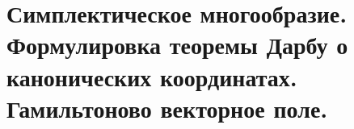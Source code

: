 \section{Симплектическое многообразие. Формулировка теоремы Дарбу о канонических координатах. Гамильтоново векторное поле.}\label{chasec24}



\newpage